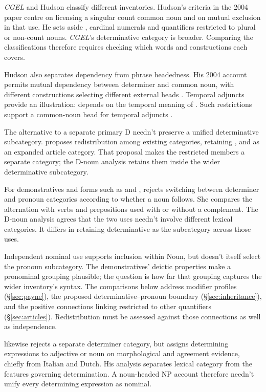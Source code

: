 \documentclass[12pt]{article}
\begin{document}
\textit{CGEL} and Hudson classify different inventories. Hudson's criteria in the 2004 paper centre on licensing a singular count common noun and on mutual exclusion in that use. He sets aside , cardinal numerals and quantifiers restricted to plural or non-count nouns. \textit{CGEL}'s determinative category is broader. Comparing the classifications therefore requires checking which words and constructions each covers.

Hudson also separates dependency from phrase headedness. His 2004 account permits mutual dependency between determiner and common noun, with different constructions selecting different external heads \citep[7--9]{hudson2004determiners}. Temporal adjuncts provide an illustration:  depends on the temporal meaning of . Such restrictions support a common-noun head for temporal adjuncts \citep[10--12]{hudson2004determiners}.

The alternative to a separate primary D needn't preserve a unified determinative subcategory. \textcite{spinillo2004reconceptualising} proposes redistribution among existing categories, retaining ,  and  as an expanded article category. That proposal makes the restricted members a separate category; the D-noun analysis retains them inside the wider determinative subcategory.

For demonstratives and forms such as  and , \textcite[140--144]{spinillo2004reconceptualising} rejects switching between determiner and pronoun categories according to whether a noun follows. She compares the alternation with verbs and prepositions used with or without a complement. The D-noun analysis agrees that the two uses needn't involve different lexical categories. It differs in retaining determinative as the subcategory across those uses.

Independent nominal use supports inclusion within Noun, but doesn't itself select the pronoun subcategory. The demonstratives' deictic properties make a pronominal grouping plausible; the question is how far that grouping captures the wider inventory's syntax. The comparisons below address modifier profiles (§\ref{sec:payne}), the proposed determinative--pronoun boundary (§\ref{sec:inheritance}), and the positive connections linking restricted  to other quantifiers (§\ref{sec:articles}). Redistribution must be assessed against those connections as well as independence.

\textcite{vaneynde2003determiner} likewise rejects a separate determiner category, but assigns determining expressions to adjective or noun on morphological and agreement evidence, chiefly from Italian and Dutch. His analysis separates lexical category from the features governing determination. A noun-headed NP account therefore needn't unify every determining expression as nominal.
\end{document}
